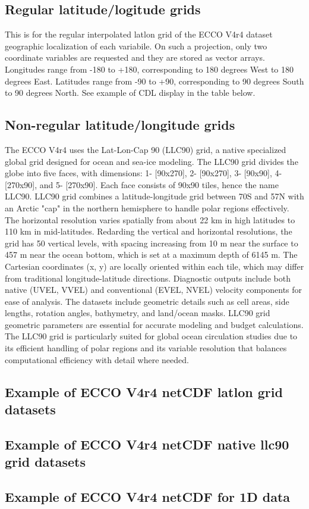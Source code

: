 \subsection*{Regular latitude/logitude grids}

\par This is for the regular interpolated latlon grid of the ECCO V4r4 dataset geographic localization of each variabile. On such a projection, only two coordinate variables are requested and they are stored as vector arrays. Longitudes range from -180 to +180, corresponding to 180 degrees West to 180 degrees East. Latitudes range from -90 to +90, corresponding to 90 degrees South to 90 degrees North. See example of CDL display in the table below.


\subsection*{Non-regular latitude/longitude grids}
\par The ECCO V4r4 uses the Lat-Lon-Cap 90 (LLC90) grid, a native specialized global grid designed for ocean and sea-ice modeling. The LLC90 grid divides the globe into five faces, with dimensions: 1- [90x270], 2- [90x270], 3- [90x90], 4- [270x90], and 5- [270x90]. Each face consists of 90x90 tiles, hence the name LLC90. LLC90 grid combines a latitude-longitude grid between 70\textdegree S and 57\textdegree N with an Arctic "cap" in the northern hemisphere to handle polar regions effectively. The horizontal resolution varies spatially from about 22 km in high latitudes to 110 km in mid-latitudes. Redarding the vertical and horizontal resolutions, the grid has 50 vertical levels, with spacing increasing from 10 m near the surface to 457 m near the ocean bottom, which is set at a maximum depth of 6145 m. The Cartesian coordinates (x, y) are locally oriented within each tile, which may differ from traditional longitude-latitude directions. Diagnostic outputs include both native (UVEL, VVEL) and conventional (EVEL, NVEL) velocity components for ease of analysis. The datasets include geometric details such as cell areas, side lengths, rotation angles, bathymetry, and land/ocean masks. LLC90 grid geometric parameters are essential for accurate modeling and budget calculations. The LLC90 grid is particularly suited for global ocean circulation studies due to its efficient handling of polar regions and its variable resolution that balances computational efficiency with detail where needed.

\pagebreak
\subsection{Example of ECCO V4r4 netCDF latlon grid datasets}

\pagebreak
\subsection{Example of ECCO V4r4 netCDF native llc90 grid datasets}

\pagebreak
\subsection{Example of ECCO V4r4 netCDF for 1D data}


